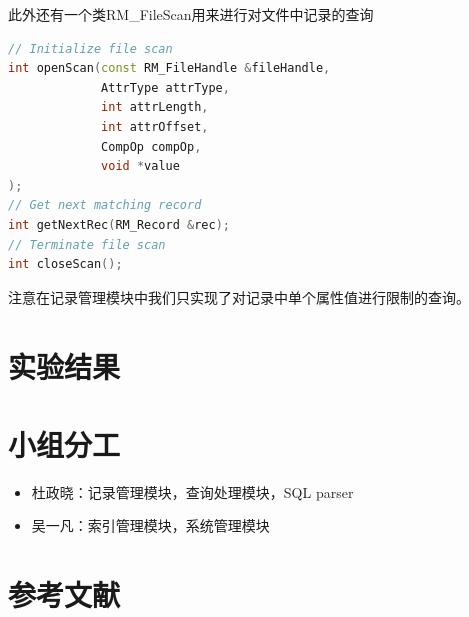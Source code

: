 \documentclass[11pt,UTF8]{report}
\begin{document}
此外还有一个类RM\_FileScan用来进行对文件中记录的查询
\begin{lstlisting}[language=C++]
// Initialize file scan
int openScan(const RM_FileHandle &fileHandle,
             AttrType attrType,
             int attrLength,
             int attrOffset,
             CompOp compOp,
             void *value
);
// Get next matching record
int getNextRec(RM_Record &rec);
// Terminate file scan
int closeScan();
\end{lstlisting}

注意在记录管理模块中我们只实现了对记录中单个属性值进行限制的查询。

\section{实验结果}

\section{小组分工}
\begin{itemize}
	\item 杜政晓：记录管理模块，查询处理模块，SQL parser
	\item 吴一凡：索引管理模块，系统管理模块
\end{itemize}

\section{参考文献}
\end{document}
